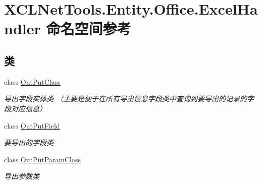 \hypertarget{namespace_x_c_l_net_tools_1_1_entity_1_1_office_1_1_excel_handler}{}\section{X\+C\+L\+Net\+Tools.\+Entity.\+Office.\+Excel\+Handler 命名空间参考}
\label{namespace_x_c_l_net_tools_1_1_entity_1_1_office_1_1_excel_handler}
\subsection*{类}
\begin{DoxyCompactItemize}
\item 
class \hyperlink{class_x_c_l_net_tools_1_1_entity_1_1_office_1_1_excel_handler_1_1_out_put_class}{Out\+Put\+Class}
\begin{DoxyCompactList}\small\item\em 导出字段实体类 （主要是便于在所有导出信息字段类中查询到要导出的记录的字段对应信息） \end{DoxyCompactList}\item 
class \hyperlink{class_x_c_l_net_tools_1_1_entity_1_1_office_1_1_excel_handler_1_1_out_put_field}{Out\+Put\+Field}
\begin{DoxyCompactList}\small\item\em 要导出的字段类 \end{DoxyCompactList}\item 
class \hyperlink{class_x_c_l_net_tools_1_1_entity_1_1_office_1_1_excel_handler_1_1_out_put_param_class}{Out\+Put\+Param\+Class}
\begin{DoxyCompactList}\small\item\em 导出参数类 \end{DoxyCompactList}\end{DoxyCompactItemize}
